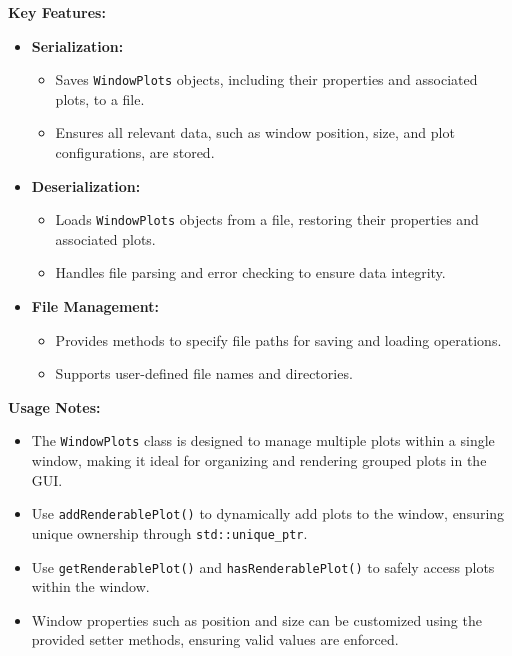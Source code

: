 \documentclass{article}
\begin{document}
\vspace{5pt}
\noindent
\textbf{Key Features:}
\begin{itemize}
    \item \textbf{Serialization:}
    \begin{itemize}
        \item Saves \texttt{WindowPlots} objects, including their properties and associated plots, to a file.

        \item Ensures all relevant data, such as window position, size, and plot configurations, are stored.
    \end{itemize}
    
    \item \textbf{Deserialization:}
    \begin{itemize}
        \item Loads \texttt{WindowPlots} objects from a file, restoring their properties and associated plots.

        \item Handles file parsing and error checking to ensure data integrity.
    \end{itemize}
    
    \item \textbf{File Management:}
    \begin{itemize}
        \item Provides methods to specify file paths for saving and loading operations.

        \item Supports user-defined file names and directories.
    \end{itemize}
\end{itemize}

\vspace{5pt}
\noindent
\textbf{Usage Notes:}
\begin{itemize}
    \item The \texttt{WindowPlots} class is designed to manage multiple plots within a single window, making it ideal for organizing and rendering grouped plots in the GUI.

    \item Use \texttt{addRenderablePlot()} to dynamically add plots to the window, ensuring unique ownership through \texttt{std::unique\_ptr}.
    
    \item Use \texttt{getRenderablePlot()} and \texttt{hasRenderablePlot()} to safely access plots within the window.

    \item Window properties such as position and size can be customized using the provided setter methods, ensuring valid values are enforced.
\end{itemize}
\end{document}
